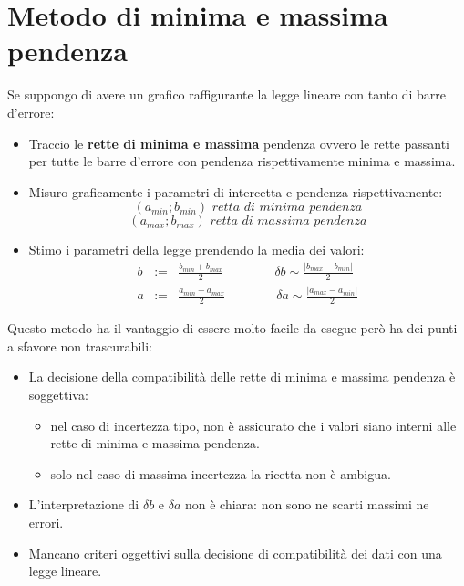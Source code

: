 \documentclass[11pt,a4paper]{book}
\begin{document}
\section{Metodo di minima e massima pendenza} 
Se suppongo di avere un grafico raffigurante la legge lineare con tanto di barre d'errore:
\begin{itemize}
\item Traccio le \textbf{rette di minima e massima} pendenza ovvero le rette passanti per tutte le barre d'errore con pendenza rispettivamente minima e massima.
\item Misuro graficamente i parametri di intercetta e pendenza rispettivamente:
\begin{equation}
(a_{min};b_{min}) \textit{ retta di minima pendenza}
\end{equation}
\begin{equation}
(a_{max};b_{max}) \textit{ retta di massima pendenza}
\end{equation}
\item Stimo i parametri della legge prendendo la media dei valori:
\begin{eqnarray}
b &:=& \frac{b_{min}+b_{max}}{2} \qquad \qquad \delta b \sim \frac{\left| b_{max}-b_{min} \right| }{2}\\
a &:=& \frac{a_{min}+a_{max}}{2} \qquad \qquad \delta a \sim \frac{\left| a_{max}-a_{min} \right| }{2}
\end{eqnarray}
\end{itemize}
Questo metodo ha il vantaggio di essere molto facile da esegue però ha dei punti a sfavore non trascurabili:
\begin{itemize}
\item La decisione della compatibilità delle rette di minima e massima pendenza è soggettiva:
\begin{itemize}
\item nel caso di incertezza tipo, non è assicurato che i valori siano interni alle rette di minima e massima pendenza.
\item solo nel caso di massima incertezza la ricetta non è ambigua.
\end{itemize}  
\item L'interpretazione di $ \delta b $ e $ \delta a $ non è chiara: non sono ne scarti massimi ne errori.
\item Mancano criteri oggettivi sulla decisione di compatibilità dei dati con una legge lineare.
\end{itemize}
\end{document}

